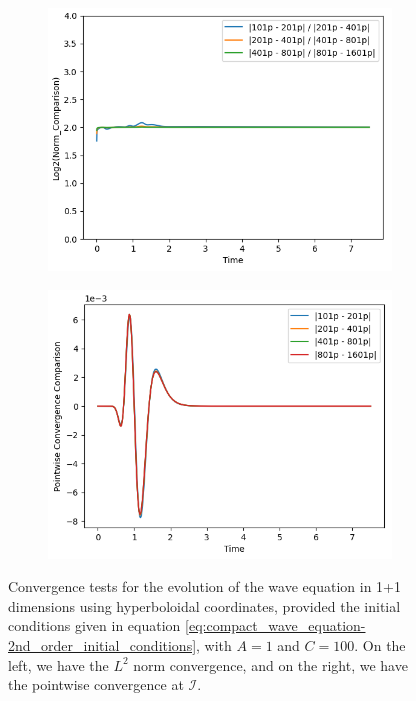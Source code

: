 \begin{figure}[h]
    \centering
    \begin{subfigure}[b]{0.45\textwidth}
        \centering
        \includegraphics[width=\textwidth]{Images/Wave_Equation_1+1-Norm.png}
    \end{subfigure}
    \hfill
    \begin{subfigure}[b]{0.45\textwidth}
        \centering
        \includegraphics[width=\textwidth]{Images/Wave_Equation_1+1-Pointwise.png}
    \end{subfigure}
    \caption{Convergence tests for the evolution of the wave equation in 1+1 dimensions using hyperboloidal coordinates, provided the initial conditions given in equation \ref{eq:compact_wave_equation-2nd_order_initial_conditions}, with $A = 1$ and $C = 100$. On the left, we have the $L^2$ norm convergence, and on the right, we have the pointwise convergence at $\mathscr{I}$.}
    \label{fig:compact_wave_equation-2nd_order-convergence}
\end{figure}